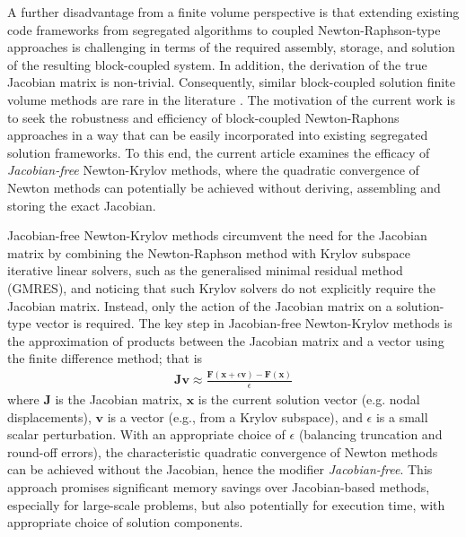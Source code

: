 \documentclass[sn-mathphys,Numbered]{sn-jnl}%
\newcommand{\bb}{\boldsymbol}
\begin{document}
A further disadvantage from a finite volume perspective is that extending existing code frameworks from segregated algorithms to coupled Newton-Raphson-type approaches is challenging in terms of the required assembly, storage, and solution of the resulting block-coupled system.
In addition, the derivation of the true Jacobian matrix is non-trivial.
Consequently, similar block-coupled solution finite volume methods are rare in the literature \citep{Das2011, Cardiff2016, Castrillo2024}.
The motivation of the current work is to seek the robustness and efficiency of block-coupled Newton-Raphons approaches in a way that can be easily incorporated into existing segregated solution frameworks.
To this end, the current article examines the efficacy of \emph{Jacobian-free} Newton-Krylov methods, where the quadratic convergence of Newton methods can potentially be achieved without deriving, assembling and storing the exact Jacobian.

Jacobian-free Newton-Krylov methods circumvent the need for the Jacobian matrix by combining the Newton-Raphson method with Krylov subspace iterative linear solvers, such as the generalised minimal residual method (GMRES), and noticing that such Krylov solvers do not explicitly require the Jacobian matrix.
Instead, only the action of the Jacobian matrix on a solution-type vector is required.
The key step in Jacobian-free Newton-Krylov methods is the approximation of products between the Jacobian matrix and a vector using the finite difference method; that is
\begin{eqnarray}
	\bb{J} \bb{v} \approx \frac{\bb{F}(\bb{x} + \epsilon \bb{v}) - \bb{F}(\bb{x})}{\epsilon}
\end{eqnarray}
where $\bb{J}$ is the Jacobian matrix, $\mathbf{x}$ is the current solution vector (e.g. nodal displacements), $\mathbf{v}$ is a vector (e.g., from a Krylov subspace), and $\epsilon$ is a small scalar perturbation.
With an appropriate choice of $\epsilon$ (balancing truncation and round-off errors), the characteristic quadratic convergence of Newton methods can be achieved without the Jacobian, hence the modifier \emph{Jacobian-free}.
This approach promises significant memory savings over Jacobian-based methods, especially for large-scale problems, but also potentially for execution time, with appropriate choice of solution components.
\end{document}

